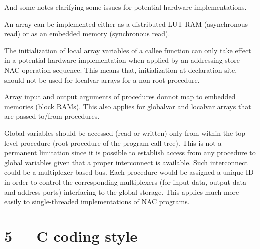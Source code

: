 \documentclass[a4paper]{article}
\begin{document}
And some notes clarifying some issues for potential hardware implementations.
\setcounter{listcnt0}{0}
\begin{list}{.}
{
\setlength{\rightmargin}{\leftmargin}
}

\item An array can be implemented either as a distributed LUT RAM (asynchronous
read) or as an embedded memory (synchronous read).

\item The initialization of local array variables of a callee function can only
take effect in a potential hardware implementation when applied by an
addressing-store NAC operation sequence. This means that, initialization
at declaration site, should not be used for localvar arrays for a non-root
procedure.

\item Array input and output arguments of procedures donnot map to embedded
memories (block RAMs). This also applies for globalvar and localvar arrays
that are passed to/from procedures.

\item Global variables should be accessed (read or written) only from within the
top-level procedure (root procedure of the program call tree). This is not
a permanent limitation since it is possible to establish access from any
procedure to global variables given that a proper interconnect is available.
Such interconnect could be a multiplexer-based bus. Each procedure would be
assigned a unique ID in order to control the corresponding multiplexers (for
input data, output data and address ports) interfacing to the global storage.
This applies much more easily to single-threaded implementations of NAC
programs.
\end{list}


\section{5~~~C coding style%
  \label{c-coding-style}%
}
\end{document}
